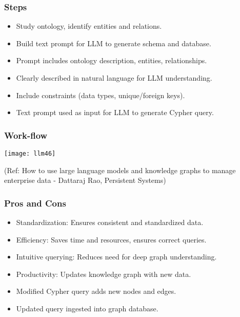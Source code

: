 \begin{frame}[fragile]\frametitle{Steps}

\begin{itemize}
\item Study ontology, identify entities and relations.
\item Build text prompt for LLM to generate schema and database.
\item Prompt includes ontology description, entities, relationships.
\item Clearly described in natural language for LLM understanding.
\item Include constraints (data types, unique/foreign keys).
\item Text prompt used as input for LLM to generate Cypher query.\end{itemize}
\end{frame}



\begin{frame}[fragile]\frametitle{Work-flow}

\begin{center}
\texttt{[image: llm46]}

{\tiny (Ref: How to use large language models and knowledge graphs to manage enterprise data - Dattaraj Rao, Persistent Systems)}
\end{center}
\end{frame}


\begin{frame}[fragile]\frametitle{Pros and Cons}

\begin{itemize}
\item Standardization: Ensures consistent and standardized data.
\item Efficiency: Saves time and resources, ensures correct queries.
\item Intuitive querying: Reduces need for deep graph understanding.
\item Productivity: Updates knowledge graph with new data.
\item Modified Cypher query adds new nodes and edges.
\item Updated query ingested into graph database.
\end{itemize}
\end{frame}


